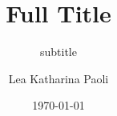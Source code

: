 \let\olditemize\itemize
\let\endolditemize\enditemize
\renewenvironment{itemize}{\begin{safeitemize}}{\end{safeitemize}}

\let\oldenumerate\enumerate
\let\endoldenumerate\endenumerate
\renewenvironment{enumerate}{\begin{safenumerate}}{\end{safenumerate}}


\title[Short Title 
]{Full Title} %
\subtitle{subtitle}
\author[L. Paoli]{Lea Katharina Paoli}
\date{\today}